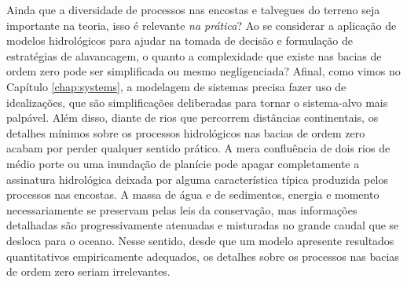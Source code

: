 \documentclass[./main.tex]{subfiles}
\begin{document}
\par Ainda que a diversidade de processos nas encostas e talvegues do terreno seja importante na teoria, isso é relevante \textit{na prática}? Ao se considerar a aplicação de modelos hidrológicos para ajudar na tomada de decisão e formulação de estratégias de alavancagem, o quanto a complexidade que existe nas bacias de ordem zero pode ser simplificada ou mesmo negligenciada? Afinal, como vimos no Capítulo \ref{chap:systems}, a modelagem de sistemas precisa fazer uso de idealizações, que são simplificações deliberadas para tornar o sistema-alvo mais palpável. Além disso, diante de rios que percorrem distâncias continentais, os detalhes mínimos sobre os processos hidrológicos nas bacias de ordem zero acabam por perder qualquer sentido prático. A mera confluência de dois rios de médio porte ou uma inundação de planície pode apagar completamente a assinatura hidrológica deixada por alguma característica típica produzida pelos processos nas encostas. A massa de água e de sedimentos, energia e momento necessariamente se preservam pelas leis da conservação, mas informações detalhadas são progressivamente atenuadas e misturadas no grande caudal que se desloca para o oceano. Nesse sentido, desde que um modelo apresente resultados quantitativos empiricamente adequados, os detalhes sobre os processos nas bacias de ordem zero seriam irrelevantes.
\end{document}
